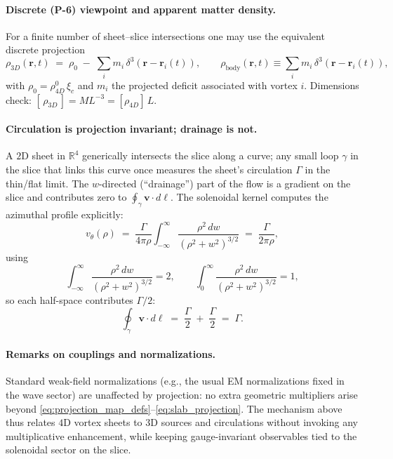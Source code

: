 \paragraph{Discrete (P-6) viewpoint and apparent matter density.}
For a finite number of sheet–slice intersections one may use the equivalent discrete projection
\begin{equation}
  \rho_{3D}(\mathbf r,t)
  \;=\;
  \rho_0 \;-\; \sum_i m_i\,\delta^3(\mathbf r-\mathbf r_i(t)),
  \qquad
  \rho_{\text{body}}(\mathbf r,t)\equiv \sum_i m_i\,\delta^3(\mathbf r-\mathbf r_i(t)),
  \label{eq:rho3D_discrete}
\end{equation}
with $\rho_0=\rho_{4D}^0\,\xi_c$ and $m_i$ the projected deficit associated with vortex $i$. Dimensions check: $[\,\rho_{3D}\,]=ML^{-3}= [\rho_{4D}]\,L$.

\paragraph{Circulation is projection invariant; drainage is not.}
A $2$D sheet in $\mathbb R^4$ generically intersects the slice along a curve; any small loop $\gamma$ in the slice that links this curve once measures the sheet's circulation $\Gamma$ in the thin/flat limit. The $w$-directed (“drainage”) part of the flow is a gradient on the slice and contributes zero to $\oint_\gamma \mathbf v\cdot d\boldsymbol\ell$. The solenoidal kernel computes the azimuthal profile explicitly:
\begin{equation}
  v_\theta(\rho)
  \;=\; \frac{\Gamma}{4\pi\rho}\int_{-\infty}^{\infty}
  \frac{\rho^2\,dw}{(\rho^2+w^2)^{3/2}}
  \;=\; \frac{\Gamma}{2\pi\rho},
  \label{eq:vtheta_kernel}
\end{equation}
using
\begin{equation}
  \int_{-\infty}^{\infty} \frac{\rho^2\,dw}{(\rho^2+w^2)^{3/2}}=2,
  \qquad
  \int_{0}^{\infty} \frac{\rho^2\,dw}{(\rho^2+w^2)^{3/2}}=1,
  \label{eq:halfspace_integrals}
\end{equation}
so each half-space contributes $\Gamma/2$:
\begin{equation}
  \oint_{\gamma}\mathbf v\cdot d\boldsymbol{\ell}
  \;=\; \frac{\Gamma}{2} \;+\; \frac{\Gamma}{2} \;=\; \Gamma .
  \label{eq:circulation_split}
\end{equation}

\paragraph{Remarks on couplings and normalizations.}
Standard weak-field normalizations (e.g., the usual EM normalizations fixed in the wave sector) are unaffected by projection: no extra geometric multipliers arise beyond \eqref{eq:projection_map_defs}–\eqref{eq:slab_projection}. The mechanism above thus relates $4$D vortex sheets to $3$D sources and circulations without invoking any multiplicative enhancement, while keeping gauge-invariant observables tied to the solenoidal sector on the slice.

